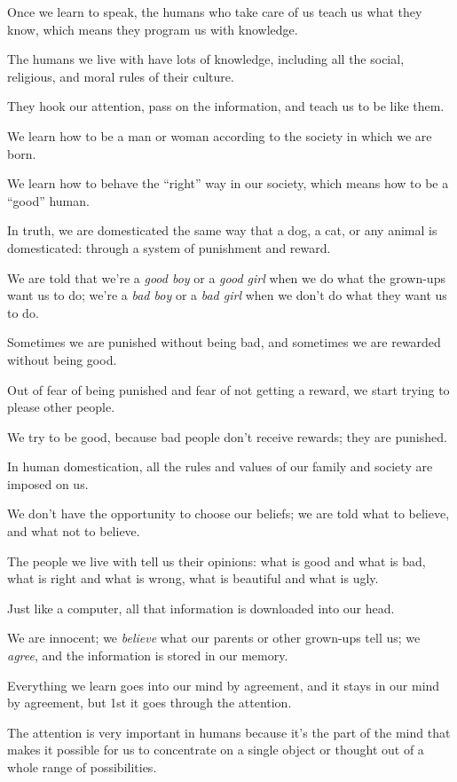 \documentclass{article}
\numberwithin{equation}{section}
\begin{document}
%
Once we learn to speak, the humans who take care of us teach us what they know, which means they program us with knowledge.

The humans we live with have lots of knowledge, including all the social, religious, and moral rules of their culture.

They hook our attention, pass on the information, and teach us to be like them.

We learn how to be a man or woman according to the society in which we are born.

We learn how to behave the ``right'' way in our society, which means how to be a ``good'' human.

%
In truth, we are domesticated the same way that a dog, a cat, or any animal is domesticated: through a system of punishment and reward.

We are told that we're a \textit{good boy} or a \textit{good girl} when we do what the grown-ups want us to do; we're a \textit{bad boy} or a \textit{bad girl} when we don't do what they want us to do.

Sometimes we are punished without being bad, and sometimes we are rewarded without being good.

Out of fear of being punished and fear of not getting a reward, we start trying to please other people.

We try to be good, because bad people don't receive rewards; they are punished.

%
In human domestication, all the rules and values of our family and society are imposed on us.

We don't have the opportunity to choose our beliefs; we are told what to believe, and what not to believe.

The people we live with tell us their opinions: what is good and what is bad, what is right and what is wrong, what is beautiful and what is ugly.

Just like a computer, all that information is downloaded into our head.

We are innocent; we \textit{believe} what our parents or other grown-ups tell us; we \textit{agree}, and the information is stored in our memory.

Everything we learn goes into our mind by agreement, and it stays in our mind by agreement, but 1st it goes through the attention.

%
The attention is very important in humans because it's the part of the mind that makes it possible for us to concentrate on a single object or thought out of a whole range of possibilities.
\end{document}
